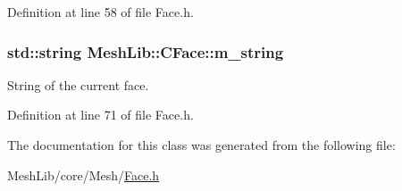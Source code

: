 Definition at line 58 of file Face.\+h.

\subsubsection[{\texorpdfstring{m\+\_\+string}{m_string}}]{\setlength{\rightskip}{0pt plus 5cm}std\+::string Mesh\+Lib\+::\+C\+Face\+::m\+\_\+string\hspace{0.3cm}{\ttfamily [protected]}}\hypertarget{class_mesh_lib_1_1_c_face_afeb880ed9fa65f4e73f8f62c96ce347c}{}\label{class_mesh_lib_1_1_c_face_afeb880ed9fa65f4e73f8f62c96ce347c}
String of the current face. 

Definition at line 71 of file Face.\+h.



The documentation for this class was generated from the following file\+:\begin{DoxyCompactItemize}
\item 
Mesh\+Lib/core/\+Mesh/\hyperlink{_face_8h}{Face.\+h}\end{DoxyCompactItemize}
